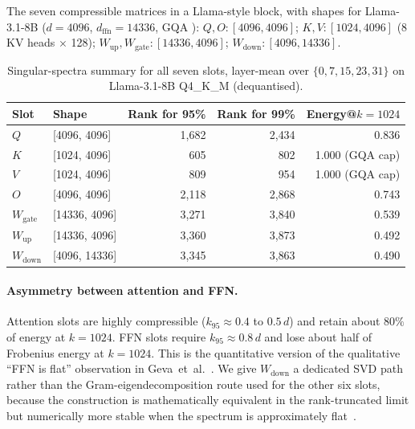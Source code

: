\documentclass[11pt]{article}
\begin{document}
The seven compressible matrices in a Llama-style block, with shapes for
Llama-3.1-8B ($d{=}4096$, $d_\text{ffn}{=}14336$, GQA \cite{ainslie2023gqa}):
$Q,O\!:\![4096,4096]$;
$K,V\!:\![1024,4096]$ (8 KV heads $\times$ 128);
$W_\text{up},W_\text{gate}\!:\![14336,4096]$;
$W_\text{down}\!:\![4096,14336]$.

\begin{table}[h]\centering\small
\caption{Singular-spectra summary for all seven slots, layer-mean over
$\{0,7,15,23,31\}$ on Llama-3.1-8B Q4\_K\_M (dequantised).}
\label{tab:slots}
\begin{tabular}{@{}llrrr@{}}
\toprule
Slot & Shape & Rank for 95\% & Rank for 99\% & Energy@$k{=}1024$ \\
\midrule
$Q$               & [4096, 4096]   & 1{,}682 & 2{,}434 & 0.836 \\
$K$               & [1024, 4096]   &   605   &   802   & 1.000 (GQA cap) \\
$V$               & [1024, 4096]   &   809   &   954   & 1.000 (GQA cap) \\
$O$               & [4096, 4096]   & 2{,}118 & 2{,}868 & 0.743 \\
$W_\text{gate}$   & [14336, 4096]  & 3{,}271 & 3{,}840 & 0.539 \\
$W_\text{up}$     & [14336, 4096]  & 3{,}360 & 3{,}873 & 0.492 \\
$W_\text{down}$   & [4096, 14336]  & 3{,}345 & 3{,}863 & 0.490 \\
\bottomrule
\end{tabular}
\end{table}

\paragraph{Asymmetry between attention and FFN.}
Attention slots are highly compressible ($k_{95}\approx 0.4$ to $0.5\,d$)
and retain about $80\%$ of energy at $k{=}1024$. FFN slots require
$k_{95}\approx 0.8\,d$ and lose about half of Frobenius energy at
$k{=}1024$. This is the quantitative version of the qualitative
``FFN is flat'' observation in Geva~et~al.~\cite{geva2021ffn}. We give
$W_\text{down}$ a dedicated SVD path rather than the
Gram-eigendecomposition route used for the other six slots, because
the construction is mathematically equivalent in the rank-truncated
limit but numerically more stable when the spectrum is approximately
flat~\cite{golub2013matrix,eckart1936}.
\end{document}
